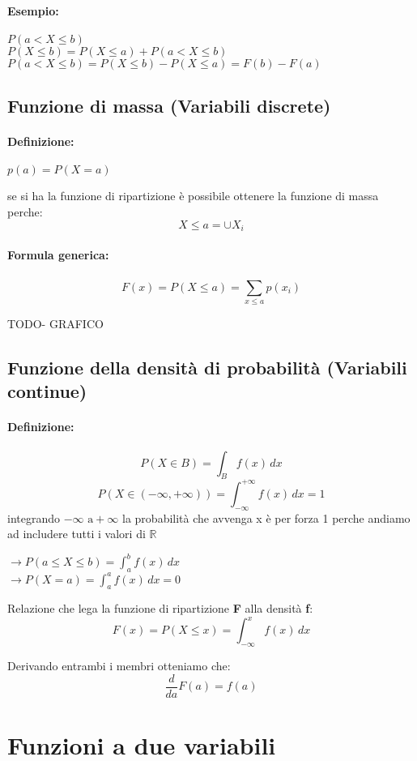 \documentclass[]{article}
\newcommand{\definizione}{\paragraph{Definizione:}}
\newcommand{\formula}{\paragraph{Formula generica:}}
\begin{document}
    \paragraph{Esempio:}
    $ P(a < X \leq b) $ \\
    $ P(X \leq b) = P(X \leq a) + P(a < X \leq b) $ \\
    $ P(a < X \leq b) = P(X \leq b) - P(X \leq a) = F(b) - F(a) $
    
  
    \subsection{Funzione di massa (Variabili discrete)}
    \definizione
    $p(a) = P(X = a) $

    se si ha la funzione di ripartizione è possibile ottenere la funzione di massa perche:
    \[ X \leq a = \cup X_i \]
    \formula \[ F(x) = P(X \leq a) = \sum_{x \leq a}^{} p(x_i) \]

    TODO- GRAFICO

    \subsection{Funzione della densità di probabilità (Variabili continue)}
    \definizione
    \[ P(X \in B) = \int_{B}^{} f(x) \,dx \]
    \[ P(X \in (-\infty, +\infty)) = \int_{-\infty}^{+\infty} f(x) \,dx=1 \]
    integrando $-\infty \text{ a} +\infty$ la probabilità che avvenga x è per forza 1 perche andiamo ad includere tutti i valori di $\mathbb{R}$

    \begin{center}
         $\longrightarrow P(a \leq X \leq b) = \int_{a}^{b} f(x) \, dx $
        \\
         $\longrightarrow P(X = a) = \int_{a}^{a} f(x) \, dx = 0 $
    \end{center}
   

    Relazione che lega la funzione di ripartizione \textbf{F} alla densità \textbf{f}:
    \[ F(x) = P(X \leq x) = \int_{-\infty}^{x} f(x )\, dx \]

    Derivando entrambi i membri otteniamo che:
    \[ \frac{d}{da} F(a) = f(a)  \]
    

    \newpage
    \section{Funzioni a due variabili}
\end{document}

